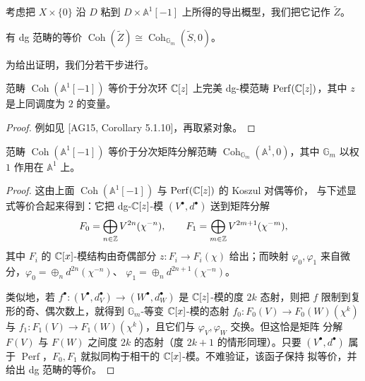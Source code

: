 
考虑把 $X\times\{0\}$ 沿 $D$ 粘到 $D\times\mathbb A^1[-1]$ 上所得的导出概型，我们把它记作
$\tilde Z$。

\begin{proposition}\label{prop:6-1-10}
有 dg 范畴的等价 $\operatorname{Coh}(\tilde Z)\cong\operatorname{Coh}_{\mathbb G_m}(\tilde S,0)$。
\end{proposition}

为给出证明，我们分若干步进行。

\begin{lemma}[{Koszul 对偶}]\label{lem:koszul-duality}
范畴 $\operatorname{Coh}(\mathbb A^1[-1])$ 等价于分次环 $\mathbb{C}[z]$ 上完美 dg-模范畴
$\operatorname{Perf}(\mathbb{C}[z])$，其中 $z$ 是上同调度为 $2$ 的变量。
\end{lemma}

\begin{proof}
例如见 [AG15, Corollary 5.1.10]，再取紧对象。
\end{proof}

\begin{lemma}\label{lem:6-1-12}
范畴 $\operatorname{Coh}(\mathbb A^1[-1])$ 等价于分次矩阵分解范畴
$\operatorname{Coh}_{\mathbb G_m}(\mathbb A^1,0)$，其中 $\mathbb G_m$ 以权 $1$ 作用在
$\mathbb A^1$ 上。
\end{lemma}

\begin{proof}
这由上面 $\operatorname{Coh}(\mathbb A^1[-1])$ 与 $\operatorname{Perf}(\mathbb{C}[z])$ 的 Koszul 对偶等价，
与下述显式等价合起来得到：它把 dg-$\mathbb{C}[z]$-模 $(V^\bullet,d^\bullet)$ 送到矩阵分解
\[
F_0=\bigoplus_{n\in\mathbb{Z}}V^{2n}(\chi^{-n}),\qquad
F_1=\bigoplus_{m\in\mathbb{Z}}V^{2m+1}(\chi^{-m}),
\]
其中 $F_i$ 的 $\mathbb{C}[x]$-模结构由奇偶部分 $z\colon F_i\to F_i(\chi)$ 给出；而映射
$\varphi_0,\varphi_1$ 来自微分，$\varphi_0=\oplus_nd^{2n}(\chi^{-n})$、
$\varphi_1=\oplus_nd^{2n+1}(\chi^{-n})$。

类似地，若 $f^\bullet\colon(V^\bullet,d_V^\bullet)\to(W^\bullet,d_W^\bullet)$ 是
$\mathbb{C}[z]$-模的度 $2k$ 态射，则把 $f$ 限制到复形的奇、偶次数上，就得到 $\mathbb G_m$-等变
$\mathbb{C}[x]$-模的态射 $f_0\colon F_0(V)\to F_0(W)(\chi^k)$ 与
$f_1\colon F_1(V)\to F_1(W)(\chi^k)$，且它们与 $\varphi_V,\varphi_W$ 交换。但这恰是矩阵
分解 $F(V)$ 与 $F(W)$ 之间度 $2k$ 的态射（度 $2k+1$ 的情形同理）。只要 $(V^\bullet,d^\bullet)$
属于 $\operatorname{Perf}$，$F_0,F_1$ 就拟同构于相干的 $\mathbb{C}[x]$-模。不难验证，该函子保持
拟等价，并给出 dg 范畴的等价。
\end{proof}

